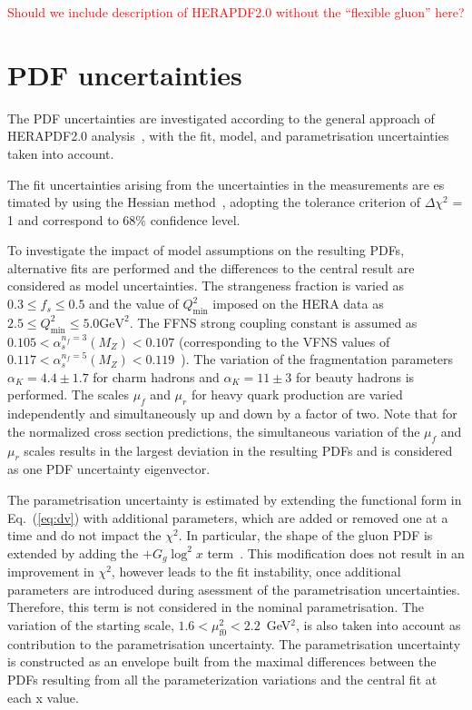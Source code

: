 \documentclass[12pt]{article}
\begin{document}
\textcolor{red}{Should we include description of HERAPDF2.0 without the ``flexible gluon'' here?}


\section{PDF uncertainties}
\label{sec:pdfparam}

The PDF uncertainties are investigated according to the general approach of HERAPDF2.0 analysis~\cite{Abramowicz:2015mha}, with the fit, model, and parametrisation uncertainties taken into account.

The fit uncertainties arising from the uncertainties in the measurements are es timated by using the Hessian method~\cite{Pumplin:2001ct}, adopting the tolerance criterion of $\Delta \chi^2$ = 1 and correspond to 68\% confidence level.

To investigate the impact of model assumptions on the resulting PDFs, alternative fits are performed and the differences to the central result are considered as model uncertainties. The strangeness fraction is varied as $0.3 \leq f_{s} \leq 0.5$ and the value of $Q^2_{\text{min}}$ imposed on the HERA data as $2.5 \leq Q^2_\textrm{min}\leq 5.0\textrm{GeV}^2$. The FFNS strong coupling constant is assumed as $0.105 < \alpha_s^{n_f=3}(M_Z) < 0.107$ (corresponding to the VFNS values of $0.117 < \alpha_s^{n_f=5}(M_Z) < 0.119$~\cite{Tanabashi:2018oca}). The variation of the fragmentation parameters $\alpha_K = 4.4 \pm 1.7$ for charm hadrons and $\alpha_K = 11 \pm 3$ for beauty hadrons is performed.
The scales $\mu_f$ and $\mu_r$ for heavy quark production are varied independently and simultaneously up and down by a factor of two. Note that for 
the normalized cross section predictions, the simultaneous variation of the $\mu_f$ and $\mu_r$ scales results in the largest deviation in the 
resulting PDFs and is considered as one PDF uncertainty eigenvector.

The parametrisation uncertainty is estimated by extending the functional form in Eq.~(\ref{eq:dv}) with additional parameters, 
which are added or removed one at a time and do not impact the $\chi^2$. 
In particular, the shape of the gluon PDF is extended by adding the $+G_g\log^2 x$ term~\cite{Bonvini:2019wxf}. This modification does not result in an improvement in $\chi^2$, however leads to the fit instability, once additional parameters are introduced during asessment of the parametrisation uncertainties. Therefore, this term is not considered in the nominal parametrisation. 
The variation of the starting scale, $1.6 < \mu_\mathrm{f0}^2 < 2.2$~GeV$^2$, is also taken into account as contribution to the parametrisation uncertainty. The parametrisation uncertainty is constructed as an envelope built from the maximal differences between the PDFs resulting from all the parameterization variations and the central fit at each x value.
\end{document}
